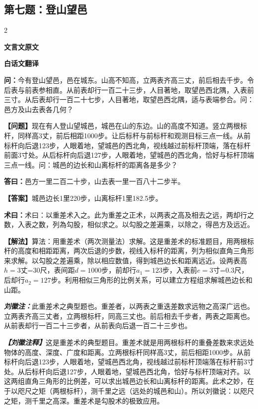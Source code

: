 \documentclass[10pt,a4paper]{article}
\newcommand{\wen}[1]{\textbf{\color{problemcolor}问：}#1\par}
\newcommand{\da}[1]{\textbf{答曰：}#1\par}
\newcommand{\shu}[1]{\textbf{术曰：}#1\par}
\newcommand{\liuhui}[1]{{\color{commentarycolor}\textit{\textbf{刘徽注：}}#1\par}}
\newcommand{\classicalheader}[1]{{\centering\large\bfseries\color{classicalcolor} #1\par\vspace{0.5em}}}
\newcommand{\wenmodern}[1]{\textbf{\color{moderncolor}【问题】}#1\par}
\newcommand{\damodern}[1]{\textbf{【答案】}#1\par}
\newcommand{\shumodern}[1]{\textbf{【解法】}#1\par}
\newcommand{\liuhuimodern}[1]{{\color{commentarycolor}\textit{\textbf{【刘徽注释】}}#1\par}}
\newcommand{\modernheader}[1]{{\centering\large\bfseries\color{moderncolor} #1\par\vspace{0.5em}}}
\newcommand{\problemsec}[1]{\subsection*{#1}}
\begin{document}
\problemsec{第七题：登山望邑}
\begin{paracol}{2}
\classicalheader{文言文原文}
\switchcolumn
\modernheader{白话文翻译}
\switchcolumn*

\wen{今有登山望邑，邑在城东。山高不知高，立两表齐高三丈，前后相去千步。令后表与前表参相直。从前表却行一百二十三步，人目著地，取望邑西北隅，入表前三寸。从后表却行一百二十七步，人目著地，取望邑西北隅，适与表端参合。问：邑方及山去表各几何？}

\switchcolumn

\wenmodern{现在有人登山望城邑，城邑在山的东边。山的高度不知道。竖立两根标杆，同样高3丈，前后相距1000步。让后标杆与前标杆和观测目标三点一线。从前标杆向后退123步，人眼着地，望城邑的西北角，视线越过前标杆顶端，落在标杆前面3寸处。从后标杆向后退127步，人眼着地，望城邑的西北角，恰好与标杆顶端三点一线。问：城邑的边长和山离标杆的距离各是多少？}

\switchcolumn*

\da{邑方一里二百二十步，山去表一里一百八十二步半。}

\switchcolumn

\damodern{城邑边长1里220步，山离标杆1里182.5步。}

\switchcolumn*

\shu{术曰：以重差术入之。此为重差之正术，以两表之高及相去之远，两却行之数，入表之数，列為勾股，相似求之。以勾股之差遍乘，以除之，得邑方及远近。}

\switchcolumn

\shumodern{算法：用重差术（两次测量法）求解。这是重差术的标准题目，用两根标杆的高度和相距距离，两次后退的步数，视线入标杆的距离，列为相似直角三角形来求解。以勾股之差遍乘，除以相应数值，得到城邑边长和距离远近。设两表高$h=3$丈=30尺，表间距$d=1000$步，前却行$a_1=123$步，入表前$e=3$寸=0.3尺，后却行$a_2=127$步。利用相似三角形的比例关系，可以建立方程组求解城邑边长和山距。}

\switchcolumn*

\liuhui{此重差术之典型题也。重差者，以两表之重迭差数求远物之高深广远也。立两表齐高三丈者，立两根标杆，同高三丈也。前后相去千步者，两表之距离也。从前表却行一百二十三步者，从前表向后退一百二十三步也。}

\switchcolumn

\liuhuimodern{这是重差术的典型题目。重差术就是用两根标杆的重叠差数来求远处物体的高度、深度、广度和距离。立两根标杆同样高3丈，前后相距1000步。从前标杆向后退123步，人眼着地，望城邑西北角，视线越过前标杆顶端落在标杆前3寸处。从后标杆向后退127步，人眼着地，望城邑西北角，恰好与标杆顶端对齐。以这两组直角三角形的比例差，可以求出城邑边长和山离标杆的距离。此术之妙，在于以咫尺之矩（两根标杆），测千里之远（远处的城邑和山）。所以刘徽说：以咫尺之矩，测千里之高深。重差术是勾股术的极致应用。}

\end{paracol}
\end{document}
